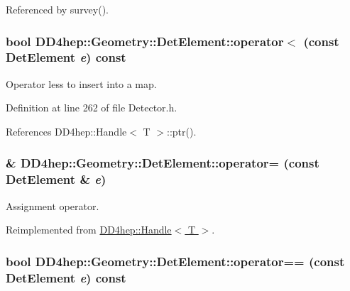 Referenced by survey().\hypertarget{class_d_d4hep_1_1_geometry_1_1_det_element_ac8e12307da748f91b989f010b06594bd}{
\subsubsection[{operator$<$}]{\setlength{\rightskip}{0pt plus 5cm}bool DD4hep::Geometry::DetElement::operator$<$ (const {\bf DetElement} {\em e}) const}}
\label{class_d_d4hep_1_1_geometry_1_1_det_element_ac8e12307da748f91b989f010b06594bd}


Operator less to insert into a map. 

Definition at line 262 of file Detector.h.

References DD4hep::Handle$<$ T $>$::ptr().\hypertarget{class_d_d4hep_1_1_geometry_1_1_det_element_a22ca67f5376d3d1c641fa02eada16c33}{
\subsubsection[{operator=}]{\& DD4hep::Geometry::DetElement::operator= (const {\bf DetElement} \& {\em e})}}
\label{class_d_d4hep_1_1_geometry_1_1_det_element_a22ca67f5376d3d1c641fa02eada16c33}


Assignment operator. 

Reimplemented from \hyperlink{class_d_d4hep_1_1_handle_a9bbf8f498df42e81ad26fb00233505a6}{DD4hep::Handle$<$ T $>$}.\hypertarget{class_d_d4hep_1_1_geometry_1_1_det_element_aa1fa06d9532161b9dc14a124d7902edd}{
\subsubsection[{operator==}]{\setlength{\rightskip}{0pt plus 5cm}bool DD4hep::Geometry::DetElement::operator== (const {\bf DetElement} {\em e}) const}}
\label{class_d_d4hep_1_1_geometry_1_1_det_element_aa1fa06d9532161b9dc14a124d7902edd}


